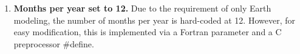 
\begin{enumerate}

\item {\bf Months per year set to 12.} Due to the requirement of only Earth modeling, the number of months per year is hard-coded at 12.  However, for easy modification, this is implemented via a Fortran parameter and a C preprocessor \#define.

\end{enumerate}
